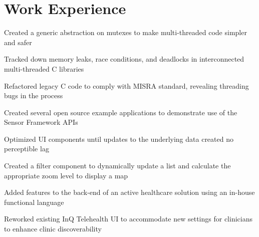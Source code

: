 \section{Work Experience}

\begin{bullets}
	\item Created a generic abstraction on mutexes to make multi-threaded code simpler and safer
    \item Tracked down memory leaks, race conditions, and deadlocks in interconnected multi-threaded C libraries
    \item Refactored legacy C code to comply with MISRA standard, revealing threading bugs in the process
    \item Created several open source example applications to demonstrate use of the Sensor Framework APIs
\end{bullets}

\hbox{}

\begin{bullets}
    \item Optimized UI components until updates to the underlying data created no perceptible lag
    \item Created a filter component to dynamically update a list and calculate the appropriate zoom level to display a map
    \item Added features to the back-end of an active healthcare solution using an in-house functional language
    \item Reworked existing InQ Telehealth UI to accommodate new settings for clinicians to enhance clinic discoverability
\end{bullets}

\hbox{}

